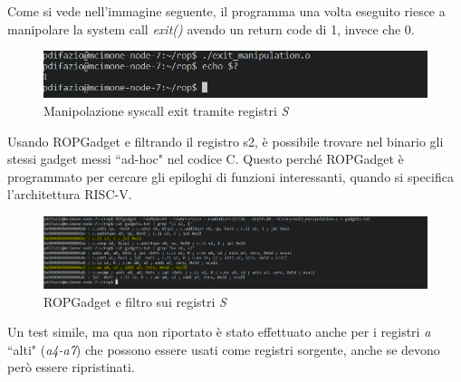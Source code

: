 Come si vede nell'immagine seguente, il programma una volta eseguito riesce a manipolare la system call \textit{exit()} avendo un return code di 1, invece che 0.
\vspace{1cm}
\FloatBarrier
\begin{figure}[!htbp]
    \centering
    \includegraphics[width=0.9\linewidth]{images/manipulate_exit.png}
    \caption{Manipolazione syscall exit tramite registri \textit{S}}
\end{figure}
\FloatBarrier
\vspace{1cm}
Usando ROPGadget e filtrando il registro s2, è possibile trovare nel binario gli stessi gadget messi ``ad-hoc" nel codice C. Questo perché ROPGadget è programmato per cercare gli epiloghi di funzioni interessanti, quando si specifica l'architettura RISC-V.
\vspace{1cm}
\FloatBarrier
\begin{figure}[!htbp]
    \centering
    \includegraphics[width=0.9\linewidth]{images/ROPGadgets_s2.png}
    \caption{ROPGadget e filtro sui registri \textit{S}}
\end{figure}
\FloatBarrier
\vspace{1cm}
Un test simile, ma qua non riportato è stato effettuato anche per i registri \textit{a} ``alti" (\textit{a4-a7}) che possono essere usati come registri sorgente, anche se devono però essere ripristinati.
